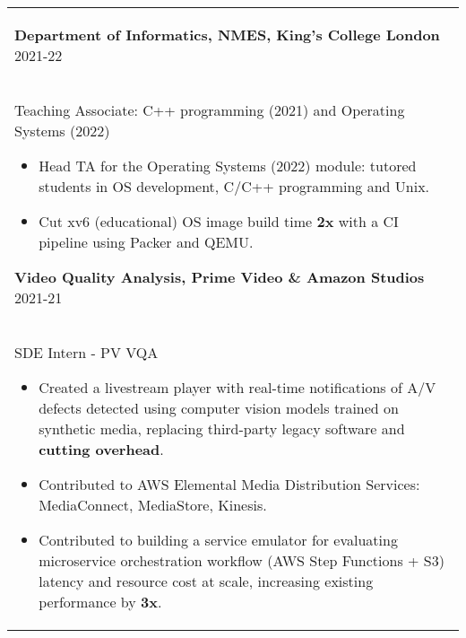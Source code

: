 \documentclass[12pt,a4paper]{article}
\begin{document}
\begin{longtable}{p{\textwidth}}
\begin{itemize}[itemsep=-2mm,topsep=0pt,partopsep=0pt,leftmargin=5mm]

       \end{itemize} \vspace{2mm}
\textbf{Department of Informatics, NMES, King's College London} \hfill \small{2021-22} \\
       Teaching Associate: C++ programming (2021) and Operating Systems (2022) 
       \begin{itemize}[itemsep=-2mm,topsep=2pt,partopsep=0pt,leftmargin=5mm]
        \item Head TA for the Operating Systems (2022) module: tutored students in OS development, C/C++ programming and Unix.
        \item Cut xv6 (educational) OS image build time \textbf{2x} with a CI pipeline using Packer and QEMU.
       \end{itemize} \vspace{2mm}
\textbf{Video Quality Analysis, Prime Video \& Amazon Studios} \hfill \small{2021-21} \\
       SDE Intern - PV VQA \vspace{1pt}
       \begin{itemize}[itemsep=-2mm,topsep=0pt,partopsep=0pt,leftmargin=5mm]
        \item Created a livestream player with real-time notifications of A/V defects detected using computer vision models trained on synthetic media, replacing third-party legacy software and \textbf{cutting overhead}.
        \item Contributed to AWS Elemental Media Distribution Services: MediaConnect, MediaStore, Kinesis.
        \item Contributed to building a service emulator for evaluating microservice orchestration workflow (AWS Step Functions + S3) latency and resource cost at scale, increasing existing performance by \textbf{3x}.

\end{itemize}
\end{longtable}
\end{document}
